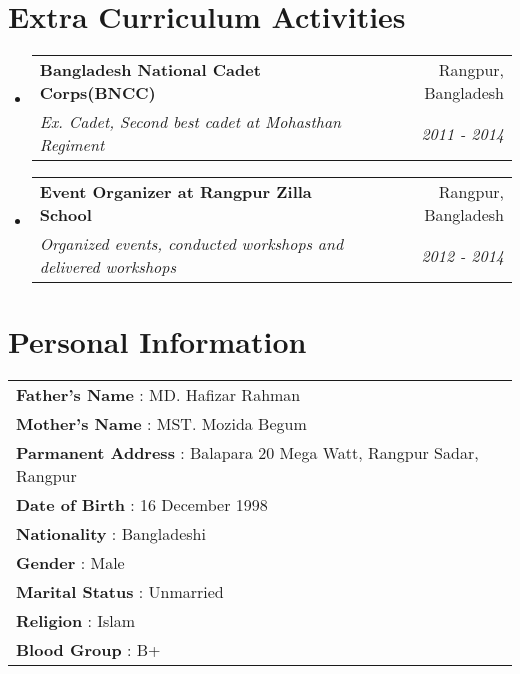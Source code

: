 \documentclass[a4paper,20pt]{article}
\makeatletter
\newcommand{\resumeSubheading}[4]{
  \vspace{-1pt}\item
    \begin{tabular*}{0.97\textwidth}{l@{\extracolsep{\fill}}r}
      \textbf{#1} & #2 \\
      \textit{#3} & \textit{#4} \\
    \end{tabular*}\vspace{-5pt}
}
\newcommand{\resumeSubHeadingListStart}{\begin{itemize}[leftmargin=*]}
\newcommand{\resumeSubHeadingListEnd}{\end{itemize}}
\makeatother
\begin{document}
\section{Extra Curriculum Activities}
  \resumeSubHeadingListStart
	\resumeSubheading
    {Bangladesh National Cadet Corps(BNCC)}{Rangpur, Bangladesh}
    {Ex. Cadet, Second best cadet at Mohasthan Regiment}{2011 - 2014}
\vspace{1pt}
    \resumeSubheading
    {Event Organizer at Rangpur Zilla School}{Rangpur, Bangladesh}
    {Organized events, conducted workshops and delivered workshops}{2012 - 2014}

\resumeSubHeadingListEnd

\vspace{5pt}

\section{Personal Information}
    \resumeSubHeadingListStart
        \begin{tabular}{l l}
            \textbf{Father's Name} \hspace{10.5mm} : \hspace{2mm} MD. Hafizar Rahman \\
            \textbf{Mother's Name} \hspace{8.9mm} : \hspace{2mm} MST. Mozida Begum \\
            \textbf{Parmanent Address} \hspace{1.5mm} : \hspace{2mm} Balapara 20 Mega Watt, Rangpur Sadar, Rangpur \\
            \textbf{Date of Birth} \hspace{12.6mm} : \hspace{2mm} 16 December 1998 \\
            \textbf{Nationality} \hspace{16.6mm} : \hspace{2mm} Bangladeshi \\
            \textbf{Gender} \hspace{23.4mm} : \hspace{2mm} Male \\
            \textbf{Marital Status} \hspace{10.6mm} : \hspace{2mm} Unmarried \\
            \textbf{Religion} \hspace{21.7mm} : \hspace{2mm} Islam \\
            \textbf{Blood Group} \hspace{13.3mm} : \hspace{2mm} B+ 
        \end{tabular}
    \resumeSubHeadingListEnd
\end{document}
